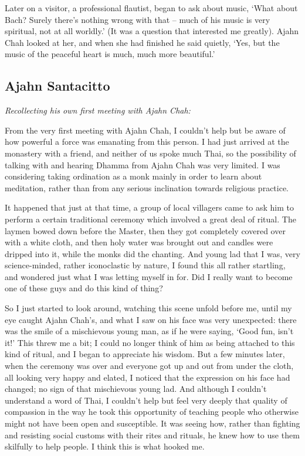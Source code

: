 Later on a visitor, a professional flautist, began to ask about music, 
`What about Bach? Surely there's nothing wrong with that -- much of his
music is very spiritual, not at all worldly.' (It was a question that
interested me greatly). Ajahn Chah looked at her, and when she had
finished he said quietly, `Yes, but the music of the peaceful heart is
much, much more beautiful.'

\subsection{Ajahn Santacitto}

\emph{Recollecting his own first meeting with Ajahn Chah:}

From the very first meeting with Ajahn Chah, I couldn't help but be
aware of how powerful a force was emanating from this person. I had just
arrived at the monastery with a friend, and neither of us spoke much
Thai, so the possibility of talking with and hearing Dhamma from Ajahn
Chah was very limited. I was considering taking ordination as a monk
mainly in order to learn about meditation, rather than from any serious
inclination towards religious practice. 

It happened that just at that time, a group of local villagers came to
ask him to perform a certain traditional ceremony which involved a great
deal of ritual. The laymen bowed down before the Master, then they got
completely covered over with a white cloth, and then holy water was
brought out and candles were dripped into it, while the monks did the
chanting. And young lad that I was, very science-minded, rather
iconoclastic by nature, I found this all rather startling, and wondered
just what I was letting myself in for. Did I really want to become one
of these guys and do this kind of thing? 

So I just started to look around, watching this scene unfold before me, 
until my eye caught Ajahn Chah's, and what I saw on his face was very
unexpected: there was the smile of a mischievous young man, as if he
were saying, `Good fun, isn't it!' This threw me a bit; I could no
longer think of him as being attached to this kind of ritual, and I
began to appreciate his wisdom. But a few minutes later, when the
ceremony was over and everyone got up and out from under the cloth, all
looking very happy and elated, I noticed that the expression on his face
had changed; no sign of that mischievous young lad. And although I
couldn't understand a word of Thai, I couldn't help but feel very deeply
that quality of compassion in the way he took this opportunity of
teaching people who otherwise might not have been open and susceptible. 
It was seeing how, rather than fighting and resisting social customs
with their rites and rituals, he knew how to use them skilfully to help
people. I think this is what hooked me. 

